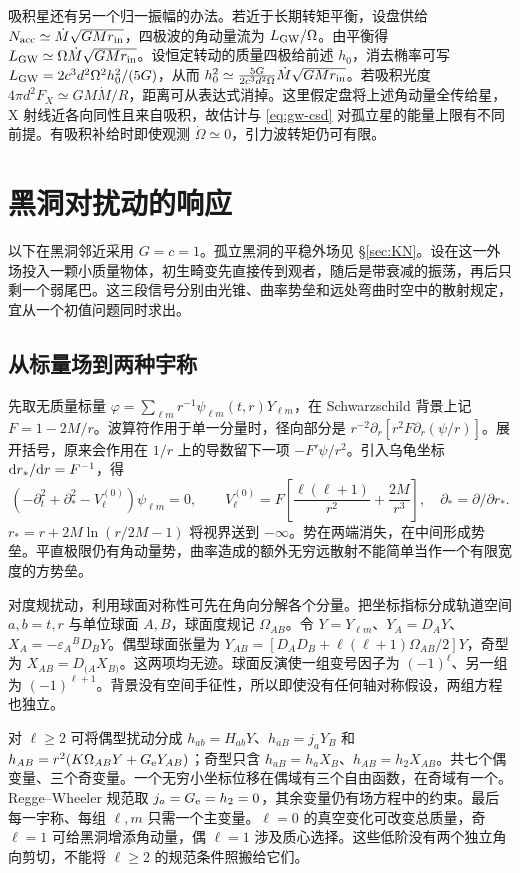 吸积星还有另一个归一振幅的办法。若近于长期转矩平衡，设盘供给 $N_{\rm acc}\simeq\dot M\sqrt{GMr_{\rm in}}$，四极波的角动量流为 $L_{\rm GW}/\Omega$。由平衡得 $L_{\rm GW}\simeq\Omega\dot M\sqrt{GMr_{\rm in}}$。设恒定转动的质量四极给前述 $h_0$，消去椭率可写 $L_{\rm GW}=2c^3d^2\Omega^2 h_0^2/(5G)$，从而 $h_0^2\simeq\frac{5G}{2c^3d^2\Omega} \dot M\sqrt{GMr_{\rm in}}$。若吸积光度 $4\pi d^2 F_X\simeq GM\dot M/R$，距离可从表达式消掉。这里假定盘将上述角动量全传给星，X 射线近各向同性且来自吸积，故估计与 \eqref{eq:gw-csd} 对孤立星的能量上限有不同前提。有吸积补给时即使观测 $\dot\Omega\simeq0$，引力波转矩仍可有限。

\section{黑洞对扰动的响应}\label{sec:gw-cbh}

以下在黑洞邻近采用 $G=c=1$。孤立黑洞的平稳外场见 \S\ref{sec:KN}。设在这一外场投入一颗小质量物体，初生畸变先直接传到观者，随后是带衰减的振荡，再后只剩一个弱尾巴。这三段信号分别由光锥、曲率势垒和远处弯曲时空中的散射规定，宜从一个初值问题同时求出。

\subsection{从标量场到两种宇称}

先取无质量标量 $\varphi=\sum_{\ell m}r^{-1}\psi_{\ell m}(t,r)Y_{\ell m}$，在 Schwarzschild 背景上记 $F=1-2M/r$。波算符作用于单一分量时，径向部分是 $r^{-2}\partial_r[r^2F\partial_r(\psi/r)]$。展开括号，原来会作用在 $1/r$ 上的导数留下一项 $-F'\psi/r^2$。引入乌龟坐标 $\dd r_*/\dd r=F^{-1}$，得
\[
 (-\partial_t^2+\partial_*^2-V_\ell^{(0)})\psi_{\ell m}=0,\qquad
 V_\ell^{(0)}=F\left[\frac{\ell(\ell+1)}{r^2}+\frac{2M}{r^3}\right],
 \quad \partial_*=\partial/\partial r_* .
\]
$r_*=r+2M\ln(r/2M-1)$ 将视界送到 $-\infty$。势在两端消失，在中间形成势垒。平直极限仍有角动量势，曲率造成的额外无穷远散射不能简单当作一个有限宽度的方势垒。

对度规扰动，利用球面对称性可先在角向分解各个分量。把坐标指标分成轨道空间 $a,b=t,r$ 与单位球面 $A,B$，球面度规记 $\Omega_{AB}$。令 $Y=Y_{\ell m}$、$Y_A=D_A Y$、$X_A=-\varepsilon_A{}^B D_BY$。偶型球面张量为 $Y_{AB}=[D_AD_B+\ell(\ell+1)\Omega_{AB}/2]Y$，奇型为 $X_{AB}=D_{(A}X_{B)}$。这两项均无迹。球面反演使一组变号因子为 $(-1)^\ell$、另一组为 $(-1)^{\ell+1}$。背景没有空间手征性，所以即使没有任何轴对称假设，两组方程也独立。

对 $\ell\ge2$ 可将偶型扰动分成 $h_{ab}=H_{ab}Y$、$h_{aB}=j_aY_B$ 和 $h_{AB}=r^2(K\Omega_{AB}Y+G_{\rm e}Y_{AB})$；奇型只含 $h_{aB}=h_aX_B$、$h_{AB}=h_2 X_{AB}$。共七个偶变量、三个奇变量。一个无穷小坐标位移在偶域有三个自由函数，在奇域有一个。Regge--Wheeler 规范取 $j_a=G_{\rm e}=h_2=0$，其余变量仍有场方程中的约束。最后每一宇称、每组 $\ell,m$ 只需一个主变量。$\ell=0$ 的真空变化可改变总质量，奇 $\ell=1$ 可给黑洞增添角动量，偶 $\ell=1$ 涉及质心选择。这些低阶没有两个独立角向剪切，不能将 $\ell\ge2$ 的规范条件照搬给它们。

